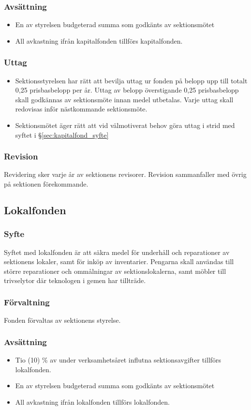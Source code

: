 \documentclass[a4paper, 10pt]{article}
\begin{document}
\subsubsection{Avsättning}
\begin{itemize}
\item En av styrelsen budgeterad summa som godkänts av sektionsmötet
\item All avkastning ifrån kapitalfonden tillförs kapitalfonden.
\end{itemize}
\subsubsection{Uttag}
\begin{itemize}
\item Sektionsstyrelsen har rätt att bevilja uttag ur fonden på belopp upp till totalt 0,25 prisbasbelopp per år. Uttag av belopp överstigande 0,25 prisbasbelopp skall godkännas av sektionsmöte innan medel utbetalas. Varje uttag skall redovisas inför nästkommande sektionsmöte.
\item Sektionsmötet äger rätt att vid välmotiverat behov göra uttag i strid med syftet i \S\ref{sec:kapitalfond_syfte}
\end{itemize}
\subsubsection{Revision}
Revidering sker varje år av sektionens revisorer. Revision sammanfaller med övrig på sektionen förekommande.

\subsection{Lokalfonden}
\subsubsection{Syfte}
\label{sec:lokalfond_syfte}
Syftet med lokalfonden är att säkra medel för underhåll och reparationer av sektionens lokaler, samt för inköp av inventarier. Pengarna skall användas till större reparationer och ommålningar av sektionslokalerna, samt möbler till trivselytor där teknologen i gemen har tillträde.
\subsubsection{Förvaltning}
Fonden förvaltas av sektionens styrelse.
\subsubsection{Avsättning}
\label{sec:lokalfond_avsattning}
\begin{itemize}
\item Tio (10) \% av under verksamhetsåret influtna sektionsavgifter tillförs lokalfonden.
\item En av styrelsen budgeterad summa som godkänts av sektionsmötet
\item All avkastning ifrån lokalfonden tillförs lokalfonden.
\end{itemize}
\end{document}
